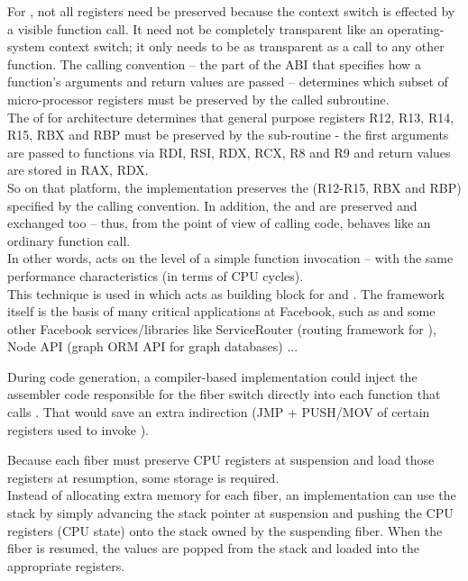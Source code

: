 \label{callingconvention}
For \fiber, not all registers need be preserved because the context
switch is effected by a visible function call. It need not be completely transparent like
an operating-system context switch; it only needs to be as transparent as a call
to any other function. The calling convention -- the part of the ABI that
specifies how a function's arguments and return values are passed -- determines
which subset of micro-processor registers must be preserved by the called
subroutine.\\

The \cite{SYSVABI} of  for 
architecture determines that general purpose registers R12, R13, R14, R15, RBX
and RBP must be preserved by the sub-routine - the first arguments are passed
to functions via RDI, RSI, RDX, RCX, R8 and R9 and return values are stored in
RAX, RDX.\\
So on that platform, the \resume implementation preserves the  (R12-R15, RBX and RBP) specified by the calling convention.
In addition, the  and  are
preserved and exchanged too -- thus, from the point of view of calling
code, \resume behaves like an ordinary function call.\\
In other words, \resume acts on the level of a simple function invocation --
with the same performance characteristics (in terms of CPU cycles).\\

This technique is used in \bcontext\cite{bcontext} which acts as building block
for \fbfibers and \bbquantum. The \fbfibers\xspace framework itself is the basis
of many critical applications at Facebook, such as \fbmcrouter\cite{fbmcrouter}
and some other Facebook services/libraries like ServiceRouter (routing framework
for \fbthrift\cite{fbthrift}), Node API (graph ORM API for graph databases) ...

 During code generation,
a compiler-based implementation could inject the assembler code responsible
for the fiber switch directly into each function that calls \resume. That would save
an extra indirection (JMP + PUSH/MOV of certain registers used to
invoke \resume).

 Because each fiber must preserve CPU
registers at suspension and load those registers at resumption, some storage
is required.\\
Instead of allocating extra memory for each fiber, an implementation can use
the stack by simply advancing the stack pointer at suspension and pushing the
CPU registers (CPU state) onto the stack owned by the suspending fiber. When
the fiber is resumed, the values are popped from the stack and loaded into the
appropriate registers.\\

